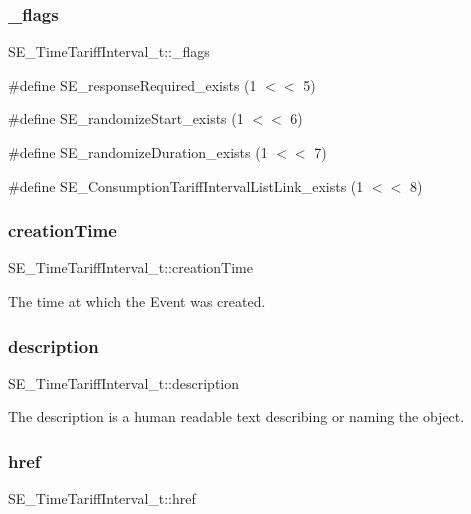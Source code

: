 \subsubsection{\texorpdfstring{\+\_\+flags}{\_flags}}
{\footnotesize\ttfamily S\+E\+\_\+\+Time\+Tariff\+Interval\+\_\+t\+::\+\_\+flags}

\#define S\+E\+\_\+response\+Required\+\_\+exists (1 $<$$<$ 5)

\#define S\+E\+\_\+randomize\+Start\+\_\+exists (1 $<$$<$ 6)

\#define S\+E\+\_\+randomize\+Duration\+\_\+exists (1 $<$$<$ 7)

\#define S\+E\+\_\+\+Consumption\+Tariff\+Interval\+List\+Link\+\_\+exists (1 $<$$<$ 8) \mbox{\label{group__TimeTariffInterval_gafda795062f9aa229e86753763e549e2f}} 
\subsubsection{\texorpdfstring{creation\+Time}{creationTime}}
{\footnotesize\ttfamily S\+E\+\_\+\+Time\+Tariff\+Interval\+\_\+t\+::creation\+Time}

The time at which the Event was created. \mbox{\label{group__TimeTariffInterval_gad1653c4c0d6ff772fef6371d9c18aa8b}} 
\subsubsection{\texorpdfstring{description}{description}}
{\footnotesize\ttfamily S\+E\+\_\+\+Time\+Tariff\+Interval\+\_\+t\+::description}

The description is a human readable text describing or naming the object. \mbox{\label{group__TimeTariffInterval_ga9ecb16673577ea0905ad798cff6cddb9}} 
\subsubsection{\texorpdfstring{href}{href}}
{\footnotesize\ttfamily S\+E\+\_\+\+Time\+Tariff\+Interval\+\_\+t\+::href}

